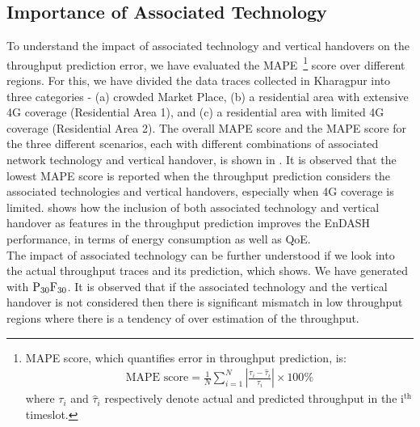 \subsection{Importance of Associated Technology}
\indent To understand the impact of associated technology and vertical handovers on the throughput prediction error, we have evaluated the \ac{MAPE}~\footnote{\indent \ac{MAPE} score, which quantifies error in throughput prediction,  is:
\begin{align}
\text{MAPE\ score} = \frac{1}{N}\sum_{i=1}^N\left|\frac{\tau_i-\hat{\tau}_i}{\tau_i}\right|\times 100\%
\end{align}
where $\tau_i$ and $\hat{\tau}_i$ respectively denote actual and  predicted throughput in the $\mathrm{i^{th}}$ timeslot.
} score over different regions. For this, we have divided the data traces collected in Kharagpur into three categories - (a) crowded Market Place, (b) a residential area with extensive \ac{4G} coverage (Residential Area 1), and (c) a residential area with limited \ac{4G} coverage (Residential Area 2). The overall \ac{MAPE} score and the \ac{MAPE} score for the three different scenarios, each with different combinations of associated network technology and vertical handover, is shown in \fig{\ref{fig:chap04:MAPE_diff_scene}}. It is observed that the lowest \ac{MAPE} score is reported when the throughput prediction considers the associated technologies and vertical handovers, especially when \ac{4G} coverage is limited.
\fig{\ref{fig:chap04:Perf_VHO}} shows how the inclusion of both associated technology and vertical handover as features in the throughput prediction improves the EnDASH performance, in terms of energy consumption as well as \ac{QoE}.\\
\indent The impact of associated technology can be further understood if we look into the actual throughput traces and its prediction, which \fig{\ref{fig:chap04:thpt_pred_trace}} shows.
We have generated  \fig{\ref{fig:chap04:thpt_pred_trace}} with $\mathrm{P_{30}F_{30}}$.
It is observed that if the associated technology and the vertical handover is not considered then there is significant mismatch in low throughput regions where there is a tendency of over estimation of the throughput.
